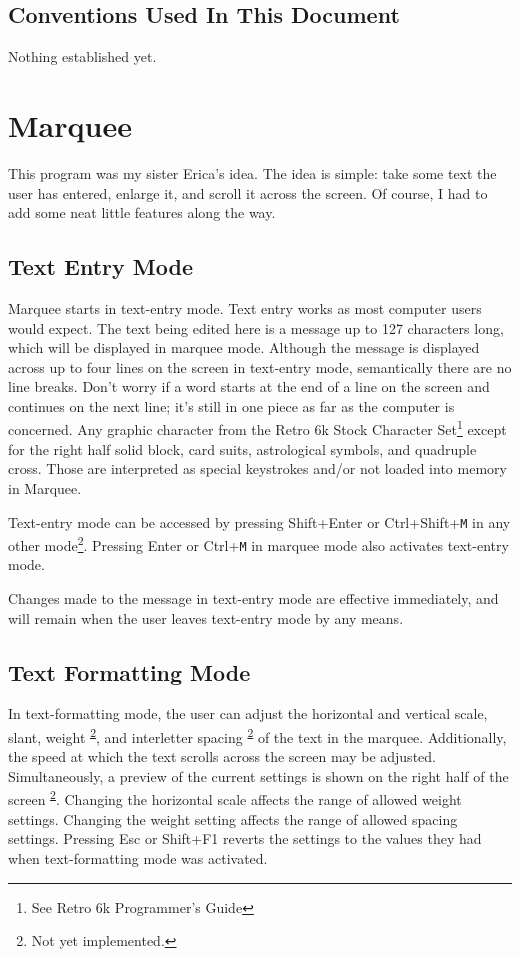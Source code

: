 \documentclass[12pt]{{memoir}}
\newcommand\dupfootnote[1]{%
\textsuperscript{\ref{#1}}}
\begin{document}
\vspace*{3in}
\section*{Conventions Used In This Document}

Nothing established yet.

\chapter{Marquee}

This program was my sister Erica's idea. The idea is simple: take some text the user has entered, enlarge it, and scroll it across the screen. Of course, I had to add some neat little features along the way.

\section{Text Entry Mode}

Marquee starts in text-entry mode. Text entry works as most computer users would expect. The text being edited here is a message up to 127 characters long, which will be displayed in marquee mode. Although the message is displayed across up to four lines on the screen in text-entry mode, semantically there are no line breaks. Don't worry if a word starts at the end of a line on the screen and continues on the next line; it's still in one piece as far as the computer is concerned. Any graphic character from the Retro 6k Stock Character Set\footnote{See Retro 6k Programmer's Guide} except for the right half solid block, card suits, astrological symbols, and quadruple cross. Those are interpreted as special keystrokes and/or not loaded into memory in Marquee.

Text-entry mode can be accessed by pressing \textsf{Shift+Enter} or \textsf{Ctrl+Shift+}\texttt{M} in any other mode\footnote{\label{marquee:f:nye}Not yet implemented.}. Pressing \textsf{Enter} or \textsf{Ctrl+}\texttt{M} in marquee mode also activates text-entry mode.

Changes made to the message in text-entry mode are effective immediately, and will remain when the user leaves text-entry mode by any means.

\section{Text Formatting Mode}

In text-formatting mode, the user can adjust the horizontal and vertical scale, slant, weight\dupfootnote{marquee:f:nye}, and interletter spacing\dupfootnote{marquee:f:nye} of the text in the marquee. Additionally, the speed at which the text scrolls across the screen may be adjusted. Simultaneously, a preview of the current settings is shown on the right half of the screen\dupfootnote{marquee:f:nye}. Changing the horizontal scale affects the range of allowed weight settings. Changing the weight setting affects the range of allowed spacing settings. Pressing \textsf{Esc} or \textsf{Shift+F1} reverts the settings to the values they had when text-formatting mode was activated.
\end{document}
